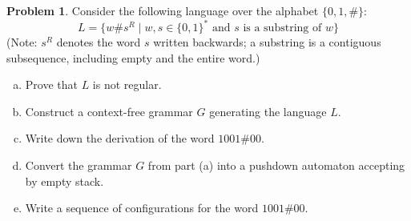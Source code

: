 \documentclass[a4paper,12pt]{article}
\theoremstyle{definition}
\newtheorem{problem}{Problem}
\begin{document}
\begin{problem}

    Consider the following language over the alphabet $\{0,1,\#\}$:
    $$
    L = \{w \# s^R \mid w,s\in\{0,1\}^*\text{ and $s$ is a substring of $w$}\}
    $$
    (Note: $s^R$ denotes the word $s$ written backwards; a substring is a contiguous subsequence, including empty and the entire word.)
    \begin{enumerate}[(a)]  
        \item Prove that $L$ is not regular.    
        \item Construct a context-free grammar $G$ generating the language $L$.
        \item Write down the derivation of the word $1001\#00$.
        \item Convert the grammar $G$ from part (a) into a pushdown automaton accepting by empty stack.
        \item Write a sequence of configurations for the word $1001\#00$.
    \end{enumerate}

\end{problem}
\end{document}
